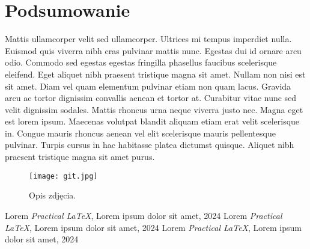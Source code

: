 \documentclass[12pt, a4paper]{article}
\begin{document}
\section{Podsumowanie}
Mattis ullamcorper velit sed ullamcorper. Ultrices mi tempus imperdiet nulla. Euismod quis viverra nibh cras pulvinar mattis nunc. Egestas dui id ornare arcu odio. Commodo sed egestas egestas fringilla phasellus faucibus scelerisque eleifend. Eget aliquet nibh praesent tristique magna sit amet. Nullam non nisi est sit amet. Diam vel quam elementum pulvinar etiam non quam lacus. Gravida arcu ac tortor dignissim convallis aenean et tortor at. Curabitur vitae nunc sed velit dignissim sodales. Mattis rhoncus urna neque viverra justo nec. Magna eget est lorem ipsum. Maecenas volutpat blandit aliquam etiam erat velit scelerisque in. Congue mauris rhoncus aenean vel elit scelerisque mauris pellentesque pulvinar. Turpis cursus in hac habitasse platea dictumst quisque. Aliquet nibh praesent tristique magna sit amet purus.
\begin{figure}[ht]
  \centering
  \texttt{[image: git.jpg]}
  \caption{Opis zdjęcia.}
\end{figure}
\newpage
\tableofcontents
\newpage
\begin{thebibliography}{3}
Lorem
\emph{Practical LaTeX},
Lorem ipsum dolor sit amet,
2024
Lorem
\emph{Practical LaTeX},
Lorem ipsum dolor sit amet,
2024
Lorem
\emph{Practical LaTeX},
Lorem ipsum dolor sit amet,
2024


\end{thebibliography}
\end{document}
